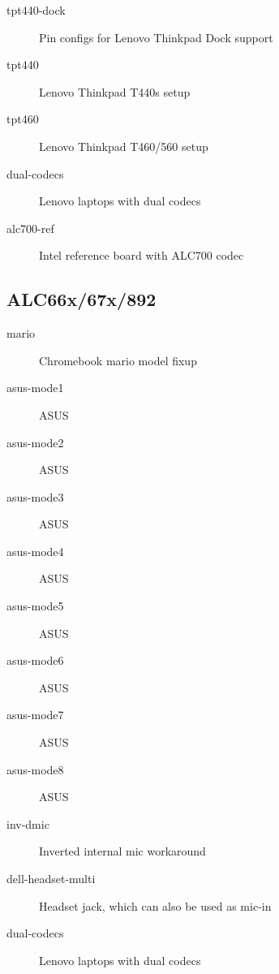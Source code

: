 \documentclass[a4paper,8pt,english]{sphinxmanual}
\begin{document}
\begin{description}
\item[{tpt440-dock}] \leavevmode
Pin configs for Lenovo Thinkpad Dock support

\item[{tpt440}] \leavevmode
Lenovo Thinkpad T440s setup

\item[{tpt460}] \leavevmode
Lenovo Thinkpad T460/560 setup

\item[{dual-codecs}] \leavevmode
Lenovo laptops with dual codecs

\item[{alc700-ref}] \leavevmode
Intel reference board with ALC700 codec

\end{description}


\subsection{ALC66x/67x/892}
\label{sound/hd-audio/models:alc66x-67x-892}\begin{description}
\item[{mario}] \leavevmode
Chromebook mario model fixup

\item[{asus-mode1}] \leavevmode
ASUS

\item[{asus-mode2}] \leavevmode
ASUS

\item[{asus-mode3}] \leavevmode
ASUS

\item[{asus-mode4}] \leavevmode
ASUS

\item[{asus-mode5}] \leavevmode
ASUS

\item[{asus-mode6}] \leavevmode
ASUS

\item[{asus-mode7}] \leavevmode
ASUS

\item[{asus-mode8}] \leavevmode
ASUS

\item[{inv-dmic}] \leavevmode
Inverted internal mic workaround

\item[{dell-headset-multi}] \leavevmode
Headset jack, which can also be used as mic-in

\item[{dual-codecs}] \leavevmode
Lenovo laptops with dual codecs

\end{description}
\end{document}
